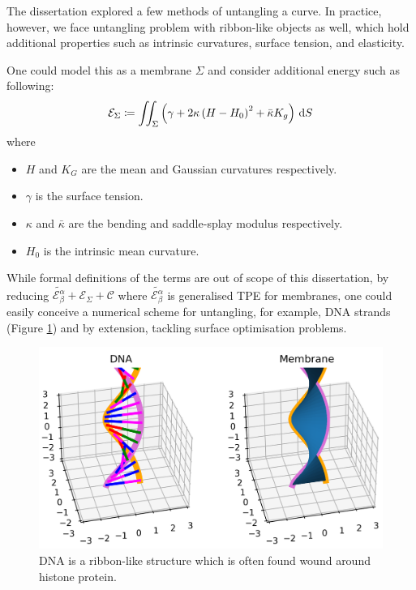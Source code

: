 \documentclass[../dissertation.tex]{subfiles}
\begin{document}
The dissertation explored a few methods of untangling a curve.
In practice, however, we face untangling problem with ribbon-like objects as well,
which hold additional properties such as intrinsic curvatures, surface tension, and elasticity.

One could model this as a membrane $\Sigma$ and consider additional energy such as following\cite{mmb}:
\begin{equation}
    \mathcal{E}_{\Sigma} \coloneqq \iint_{\Sigma} \left( \gamma + 2 \kappa \left( H-H_0 \right)^2 + \bar \kappa K_g \right) \, \text{d} S
\end{equation}
where
\begin{itemize}
    \item $H$ and $K_G$ are the mean and Gaussian curvatures respectively.
    \item $\gamma$ is the surface tension.
    \item $\kappa$ and $\bar \kappa$ are the bending and saddle-splay modulus respectively.
    \item $H_0$ is the intrinsic mean curvature.
\end{itemize}
While formal definitions of the terms are out of scope of this dissertation,
by reducing $\tilde{\mathcal{E}_{\beta}^{\alpha}} + \mathcal{E}_{\Sigma} + \mathcal{C}$ where $\tilde{\mathcal{E}_{\beta}^{\alpha}}$ is generalised TPE for membranes,
one could easily conceive a numerical scheme for untangling, for example, DNA strands (Figure \ref{fig: DNA}) and by extension, tackling surface optimisation problems.

\begin{figure}[tbp]
    \centering
    \includegraphics[scale=0.7]{sections/MembraneImgs/dnaMembrane}
    \caption{DNA is a ribbon-like structure which is often found wound around histone protein.\cite{gilchrist_2023}}
    \label{fig: DNA}
\end{figure}

\end{document}
